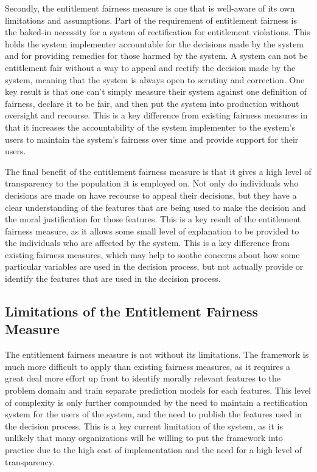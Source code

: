 Secondly, the entitlement fairness measure is one that is well-aware of its own
limitations and assumptions. Part of the requirement of entitlement fairness is
the baked-in necessity for a system of rectification for entitlement violations.
This holds the system implementer accountable for the decisions made by the
system and for providing remedies for those harmed by the system. A system can
not be entitlement fair without a way to appeal and rectify the decision made by
the system, meaning that the system is always open to scrutiny and correction.
One key result is that one can't simply measure their system against one 
definition of fairness, declare it to be fair, and then put the system into
production without oversight and recourse. This is a key difference from 
existing fairness measures in that it increases the accountability of the system
implementer to the system's users to maintain the system's fairness over time
and provide support for their users. 

The final benefit of the entitlement fairness measure is that it gives a high
level of transparency to the population it is employed on. Not only do
individuals who decisions are made on have recourse to appeal their decisions, 
but they have a clear understanding of the features that are being used to make
the decision and the moral justification for those features. This is a key 
result of the entitlement fairness measure, as it allows some small level of
explanation to be provided to the individuals who are affected by the system.
This is a key difference from existing fairness measures, which may help to
soothe concerns about how some particular variables are used in the decision 
process, but not actually provide or identify the features that are used in the
decision process. 

\subsection{Limitations of the Entitlement Fairness Measure}

The entitlement fairness measure is not without its limitations. The framework
is much more difficult to apply than existing fairness measures, as it requires
a great deal more effort up front to identify morally relevant features to the
problem domain and train separate prediction models for each features. This 
level of complexity is only further compounded by the need to maintain a 
rectification system for the users of the system, and the need to publish the
features used in the decision process. This is a key current limitation of the
system, as it is unlikely that many organizations will be willing to put the 
framework into practice due to the high cost of implementation and the need for
a high level of transparency.


